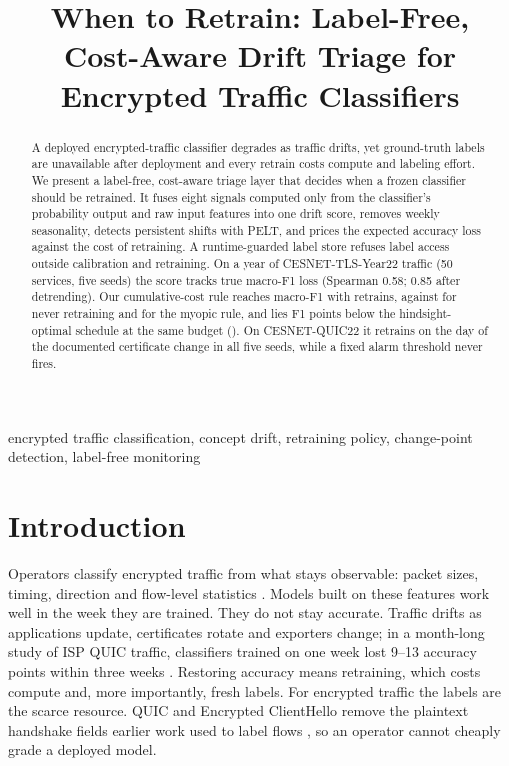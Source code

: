 \documentclass[conference]{IEEEtran}
\begin{document}
\title{When to Retrain: Label-Free, Cost-Aware Drift Triage for Encrypted Traffic Classifiers}

\author{
\and
{}
\and
{}}

\maketitle

\begin{abstract}
A deployed encrypted-traffic classifier degrades as traffic drifts, yet ground-truth labels are unavailable after deployment and every retrain costs compute and labeling effort. We present a label-free, cost-aware triage layer that decides when a frozen classifier should be retrained. It fuses eight signals computed only from the classifier's probability output and raw input features into one drift score, removes weekly seasonality, detects persistent shifts with PELT, and prices the expected accuracy loss against the cost of retraining. A runtime-guarded label store refuses label access outside calibration and retraining. On a year of CESNET-TLS-Year22 traffic (50 services, five seeds) the score tracks true macro-F1 loss (Spearman 0.58; 0.85 after detrending). Our cumulative-cost rule reaches \fonePfourc{} macro-F1 with \retrPfourc{} retrains, against \fonePzero{} for never retraining and \fonePfour{} for the myopic rule, and lies \gapPfourc{} F1 points below the hindsight-optimal schedule at the same budget (\gapscope). On CESNET-QUIC22 it retrains on the day of the documented certificate change in all five seeds, while a fixed alarm threshold never fires.
\end{abstract}

\begin{IEEEkeywords}
encrypted traffic classification, concept drift, retraining policy, change-point detection, label-free monitoring
\end{IEEEkeywords}

\section{Introduction}
Operators classify encrypted traffic from what stays observable: packet sizes, timing, direction and flow-level statistics \cite{goli2018,alobaidy2019,rachmawati2021}. Models built on these features work well in the week they are trained. They do not stay accurate. Traffic drifts as applications update, certificates rotate and exporters change; in a month-long study of ISP QUIC traffic, classifiers trained on one week lost 9--13 accuracy points within three weeks \cite{luxemburk2023}. Restoring accuracy means retraining, which costs compute and, more importantly, fresh labels. For encrypted traffic the labels are the scarce resource. QUIC and Encrypted ClientHello remove the plaintext handshake fields earlier work used to label flows \cite{luxemburk2023,shamsimukhametov2022}, so an operator cannot cheaply grade a deployed model.
\end{document}
